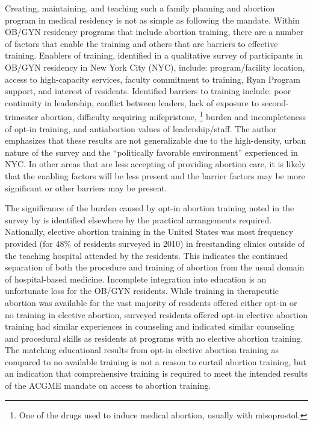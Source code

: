 \documentclass[letterpaper, 12pt]{article}
\begin{document}
Creating, maintaining, and teaching such a family planning and abortion program in medical residency is not as simple as following the mandate. Within OB/GYN residency programs that include abortion training, there are a number of factors that enable the training and others that are barriers to effective training.
Enablers of training, identified in a qualitative survey of participants in OB/GYN residency in New York City (NYC), include: program/facility location, access to high-capacity services, faculty commitment to training, Ryan Program \autocite{bixby_center_for_global_reproductive_health_education_????} \autocite{bixby_center_for_global_reproductive_health_home_????} \autocite{steinauer_benefits_2013} support, and interest of residents. \autocite[pg. 240--2]{guiahi_enablers_2013}
Identified barriers to training include: poor continuity in leadership, conflict between leaders, lack of exposure to second-trimester abortion, difficulty acquiring mifepristone, \footnote{One of the drugs used to induce medical abortion, usually with misoprostol.} burden and incompleteness of opt-in training, and antiabortion values of leadership/staff. \autocite[pg. 242]{guiahi_enablers_2013}
The author emphasizes that these results are not generalizable due to the high-density, urban nature of the survey and the ``politically favorable environment'' experienced in NYC. \autocite[pg. 243]{guiahi_enablers_2013}
In other areas that are less accepting of providing abortion care, it is likely that the enabling factors will be less present and the barrier factors may be more significant or other barriers may be present.

The significance of the burden caused by opt-in abortion training noted in the survey by \citeauthor{guiahi_enablers_2013} is identified elsewhere by the practical arrangements required.
Nationally, elective abortion training in the United States was most frequency provided (for 48\% of residents surveyed in 2010) in freestanding clinics outside of the teaching hospital attended by the residents. \autocite[pg. 274]{turk_availability_2014} This indicates the continued separation of both the procedure and training of abortion from the usual domain of hospital-based medicine. Incomplete integration into education is an unfortunate loss for the OB/GYN residents.
While training in therapeutic abortion was available for the vast majority of residents offered either opt-in or no training in elective abortion, surveyed residents offered opt-in elective abortion training had similar experiences in counseling and indicated similar counseling and procedural skills as residents at programs with no elective abortion training. \autocite[pg. 275--6]{turk_availability_2014}
The matching educational results from opt-in elective abortion training as compared to no available training is not a reason to curtail abortion training, but an indication that comprehensive training is required to meet the intended results of the ACGME mandate on access to abortion training.
\end{document}
